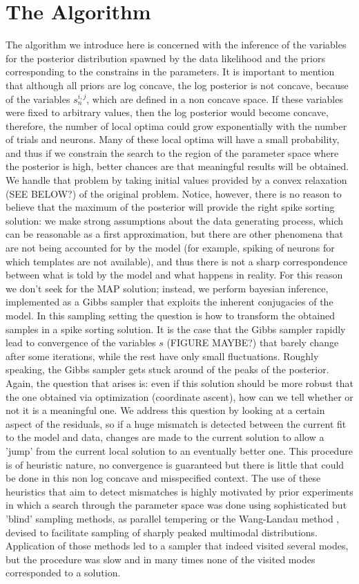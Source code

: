 \documentclass[12pt,letterpaper,fleqn]{article}
\begin{document}
\section{The Algorithm}
The algorithm we introduce here is concerned with the inference of the variables for the posterior distribution spawned by the data likelihood and the priors corresponding to the constrains in the parameters. It is important to mention that although all priors are log concave, the log posterior is not concave, because of the variables $s_n^{i,j}$, which are defined in a non concave space. If these variables were fixed to arbitrary values, then the log posterior would become concave, therefore, the number of local optima could grow exponentially with the number of trials and neurons. Many of these local optima will have a small probability, and thus if we constrain the search to the region of the parameter space where the posterior is high, better chances are that meaningful results will be obtained. We handle that problem by taking initial values provided by a convex relaxation (SEE BELOW?) of the original problem. Notice, however, there is no reason to believe that the maximum of the posterior will provide the right spike sorting solution: we make strong assumptions about the data generating process, which can be reasonable as a first approximation, but there are other phenomena that are not being accounted for by the model (for example, spiking of neurons for which templates are not available), and thus there is not a sharp correspondence between what is told by the model and what happens in reality. For this reason we don't seek for the MAP solution; instead, we perform bayesian inference, implemented as a Gibbs sampler \cite{Geman84} that exploits the inherent conjugacies of the model. In this sampling setting the question is how to transform the obtained samples in a spike sorting solution. It is the case that the Gibbs sampler rapidly lead to convergence of the variables $s$ (FIGURE MAYBE?) that barely change after some iterations, while the rest have only small fluctuations. Roughly speaking, the Gibbs sampler gets stuck around of the peaks of the posterior. Again, the question that arises is: even if this solution should be more robust that the one obtained via optimization (coordinate ascent), how can we tell whether or not it is a meaningful one. We address this question by looking at a certain aspect of the residuals, so if a huge mismatch is detected between the current fit to the model and data, changes are made to the current solution to allow a 'jump' from the current local solution to an eventually better one. This procedure is of heuristic nature, no convergence is guaranteed but there is little that could be done in this non log concave and misspecified context. The use of these heuristics that aim to detect mismatches is highly motivated by prior experiments in which a search through the parameter space was done using sophisticated but 'blind' sampling methods, as parallel tempering \cite{Earl05} or the Wang-Landau method \cite{Atchade10}, devised to facilitate sampling of sharply peaked multimodal distributions. Application of those methods led to a sampler that indeed visited several modes, but the procedure was slow and in many times none of the visited modes corresponded to a solution.
\end{document}

